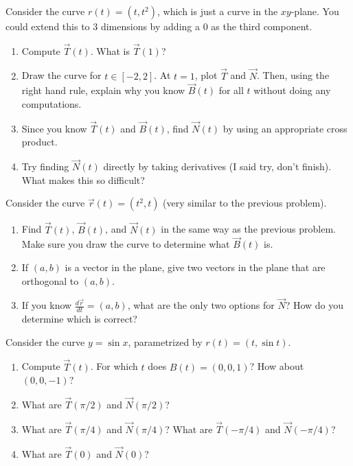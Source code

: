 \begin{problem}
%
 Consider the curve $r(t)=(t,t^2)$, which is just a curve in the $xy$-plane. You could extend this to 3 dimensions by adding a 0 as the third component.  
\begin{enumerate}
 \item Compute $\vec T(t)$.  What is $\vec T(1)$?
 \item Draw the curve for $t\in[-2,2]$.  At $t=1$, plot $\vec T$ and $\vec N$. Then, using the right hand rule, explain why you know $\vec B(t)$ for all $t$ without doing any computations.
 \item Since you know $\vec T(t)$ and $\vec B(t)$, find $\vec N(t)$ by using an appropriate cross product.
 \item Try finding $\vec N(t)$ directly by taking derivatives (I said try, don't finish).  What makes this so difficult?
\end{enumerate}
\end{problem}

\begin{problem}
%
 Consider the curve $\vec r(t)=(t^2,t)$ (very similar to the previous problem).
\begin{enumerate}
 \item Find $\vec T(t)$, $\vec B(t)$, and $\vec N(t)$ in the same way as the previous problem. Make sure you draw the curve to determine what $\vec B(t)$ is.
 \item If $(a,b)$ is a vector in the plane, give two vectors in the plane that are orthogonal to $(a,b)$.
 \item If you know $\frac{d\vec r}{dt}=(a,b)$, what are the only two options for $\vec N$?  How do you determine which is correct?
\end{enumerate}
\end{problem}


\begin{problem}
%
 Consider the curve $y=\sin x$, parametrized by $r(t)=(t,\sin t)$. 
\begin{enumerate}
 \item Compute $\vec T(t)$. For which $t$ does $B(t)=(0,0,1)$? How about $(0,0,-1)$?
 \item What are $\vec T(\pi/2)$ and $\vec N(\pi/2)$?
 \item What are $\vec T(\pi/4)$ and $\vec N(\pi/4)$? What are $\vec T(-\pi/4)$ and $\vec N(-\pi/4)$?
 \item What are $\vec T(0)$ and $\vec N(0)$?
\end{enumerate}
\end{problem}




